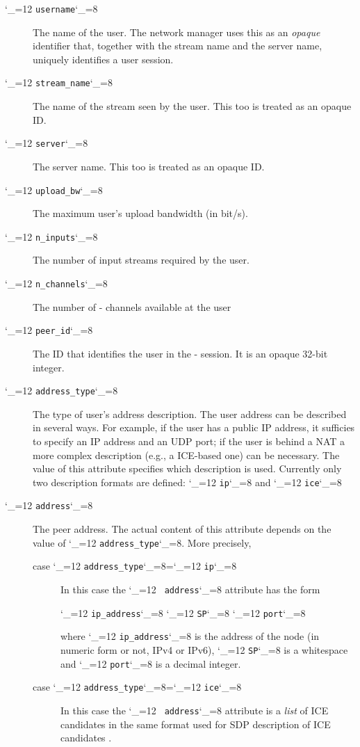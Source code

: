 \documentclass[a4paper,10pt]{medusabook}
\def\ttt{\catcode`\_=12 \tttii}
\def\tttii#1!{{\tt #1}\catcode`\_=8{}}
\begin{document}
\begin{description}
\item[\ttt username!] The name of the user.  The network manager
  uses this as an \emph{opaque} identifier that, together with the
  stream name and the server name, uniquely identifies a user session.
\item[\ttt stream\_name!]  The name of the stream seen by the user. 
This too is treated as an opaque ID.
\item[\ttt server!] The server name.  This too is treated as an opaque
  ID.
\item[\ttt upload\_bw!] The maximum user's upload bandwidth (in bit/s).
\item[\ttt n\_inputs!] The number of input streams required by the
  user. 
\item[\ttt n\_channels!] The number of \ppetp- channels available at
  the user
\item[\ttt peer\_id!] The ID that identifies the user in the \ppetp-
  session.  It is an opaque 32-bit integer.
\item[\ttt address\_type!] The type of user's address description.
  The user address can be described in several ways.  For example, if
  the user has a public IP address, it sufficies to specify an IP
  address and an UDP port; if the user is behind a NAT a more complex
  description (e.g., a ICE-based one) can be necessary.  The value of
  this attribute specifies which description is used.  Currently only
  two description formats are defined: \ttt ip! and \ttt ice!
\item[\ttt address!] The peer address.  The actual content of this
  attribute depends on the value of \ttt address\_type!.  More
  precisely,
  \begin{description}
    \item[case \ttt address\_type!=\ttt ip!]  In this case the \ttt
    address! attribute has the form 

\centerline{\ttt ip\_address! \ttt SP! \ttt port!}

where \ttt ip\_address! is the address of the node (in numeric form or
not, IPv4 or IPv6), \ttt SP! is a whitespace and \ttt port! is a
decimal integer.
    \item[case \ttt address\_type!=\ttt ice!] In this case the \ttt
    address! attribute is a \emph{list} of ICE candidates in the same
    format used for SDP description of ICE candidates \cite{ice-draft-19}.
  \end{description}
\end{description}
\end{document}
